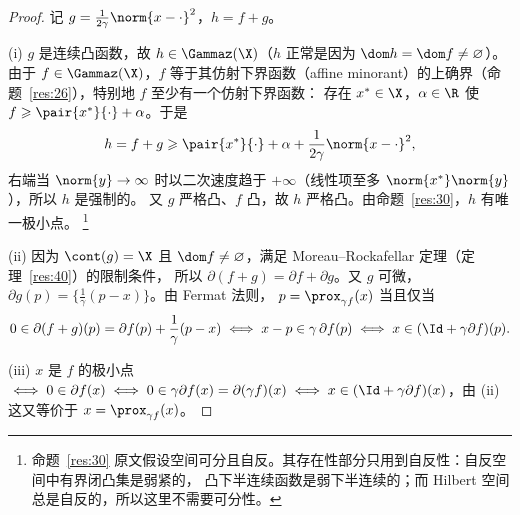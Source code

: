 \begin{proof}
记 $g=\frac1{2\gamma}\norm{x-\cdot}^2$，$h=f+g$。

(i) $g$ 是连续凸函数，故 $h\in\Gammaz(\X)$（$h$ 正常是因为 $\dom h=\dom f\neq\varnothing$）。
由于 $f\in\Gammaz(\X)$，$f$ 等于其仿射下界函数（affine minorant）的上确界（命题~\ref{res:26}），特别地 $f$ 至少有一个仿射下界函数：
存在 $x^*\in\X$，$\alpha\in\R$ 使 $f\geqslant\pair{x^*}{\cdot}+\alpha$。于是
\[
  h=f+g\geqslant\pair{x^*}{\cdot}+\alpha+\frac1{2\gamma}\norm{x-\cdot}^2 ,
\]
右端当 $\norm{y}\to\infty$ 时以二次速度趋于 $+\infty$（线性项至多 $\norm{x^*}\norm{y}$），所以 $h$ 是强制的。
又 $g$ 严格凸、$f$ 凸，故 $h$ 严格凸。由命题~\ref{res:30}，$h$ 有唯一极小点。%
\footnote{命题~\ref{res:30} 原文假设空间可分且自反。其存在性部分只用到自反性：自反空间中有界闭凸集是弱紧的，
凸下半连续函数是弱下半连续的；而 Hilbert 空间总是自反的，所以这里不需要可分性。}

(ii) 因为 $\cont(g)=\X$ 且 $\dom f\neq\varnothing$，满足 Moreau--Rockafellar 定理（定理~\ref{res:40}）的限制条件，
所以 $\partial(f+g)=\partial f+\partial g$。又 $g$ 可微，$\partial g(p)=\{\frac1\gamma(p-x)\}$。由 Fermat 法则，
$p=\prox_{\gamma f}(x)$ 当且仅当
\[
  0\in\partial(f+g)(p)=\partial f(p)+\frac1\gamma(p-x)
  \iff x-p\in\gamma\,\partial f(p)
  \iff x\in(\Id+\gamma\partial f)(p).
\]

(iii) $x$ 是 $f$ 的极小点 $\iff 0\in\partial f(x)\iff 0\in\gamma\partial f(x)=\partial(\gamma f)(x)
\iff x\in(\Id+\gamma\partial f)(x)$，由 (ii) 这又等价于 $x=\prox_{\gamma f}(x)$。
\end{proof}

